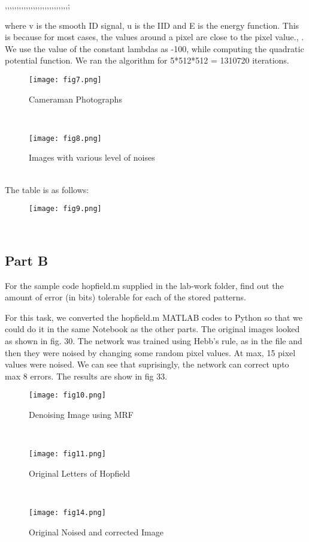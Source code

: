 ,,,,,,,,,,,,,,,,,,,,,,,,,,,;\documentclass[conference]{IEEEtran}
\begin{document}
 where v is the smooth ID signal, u is the IID and E is the
energy function.
This is because for most cases, the values around a pixel
are close to the pixel value.\cite{b15}, \cite{b16}. We use the value of
the constant lambdas as -100, while computing the quadratic
potential function.
We ran the algorithm for 5*512*512 = 1310720 iterations.
\\
\begin{figure}[htbp]
\centerline{\texttt{[image: fig7.png]}}
\caption{Cameraman Photographs}
\label{figure}
\end{figure}
\\
\begin{figure}[htbp]
\centerline{\texttt{[image: fig8.png]}}
\caption{Images with various level of noises}
\label{figure}
\end{figure}
\\
The table is as follows: 
\begin{figure}[htbp]
\centerline{\texttt{[image: fig9.png]}}
\end{figure}
\\
\subsection{Part B}
\par  For the sample code hopfield.m supplied in the lab-work
folder, find out the amount of error (in bits) tolerable for each
of the stored patterns.
\par For this task, we converted the hopfield.m MATLAB codes
to Python so that we could do it in the same Notebook as the
other parts. The original images looked as shown in fig. 30.
The network was trained using Hebb's rule, as in the file
and then they were noised by changing some random pixel
values. At max, 15 pixel values were noised. We can see that suprisingly,
the network can correct upto max 8 errors. The results are show in fig 33.
\\
\begin{figure}[htbp]
\centerline{\texttt{[image: fig10.png]}}
\caption{Denoising Image using MRF}
\label{figure}
\end{figure}
\\
\begin{figure}[htbp]
\centerline{\texttt{[image: fig11.png]}}
\caption{Original Letters of Hopfield}
\label{figure}
\end{figure}
\\
\begin{figure}[htbp]
\centerline{\texttt{[image: fig14.png]}}
\caption{Original Noised and corrected Image}
\label{figure}
\end{figure}
\end{document}
